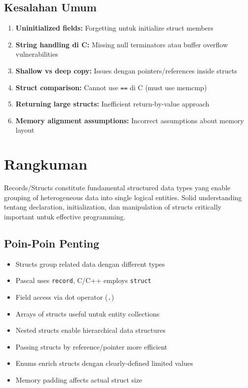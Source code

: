 \documentclass[../main.tex]{subfiles}
\begin{document}
\subsection{Kesalahan Umum}

\begin{enumerate}
  \item \textbf{Uninitialized fields:} Forgetting untuk initialize struct members
  \item \textbf{String handling di C:} Missing null terminators atau buffer overflow vulnerabilities
  \item \textbf{Shallow vs deep copy:} Issues dengan pointers/references inside structs
  \item \textbf{Struct comparison:} Cannot use \texttt{==} di C (must use memcmp)
  \item \textbf{Returning large structs:} Inefficient return-by-value approach
  \item \textbf{Memory alignment assumptions:} Incorrect assumptions about memory layout
\end{enumerate}

\section{Rangkuman}

Records/Structs constitute fundamental structured data types yang enable grouping of heterogeneous data into single logical entities. Solid understanding tentang declaration, initialization, dan manipulation of structs critically important untuk effective programming.

\subsection{Poin-Poin Penting}

\begin{itemize}
  \item Structs group related data dengan different types
  \item Pascal uses \texttt{record}, C/C++ employs \texttt{struct}
  \item Field access via dot operator (\texttt{.})
  \item Arrays of structs useful untuk entity collections
  \item Nested structs enable hierarchical data structures
  \item Passing structs by reference/pointer more efficient
  \item Enums enrich structs dengan clearly-defined limited values
  \item Memory padding affects actual struct size
\end{itemize}
\end{document}

